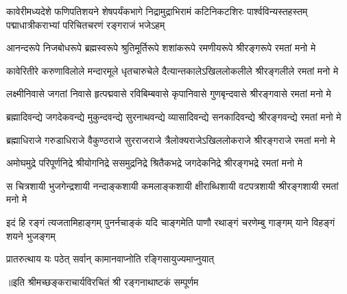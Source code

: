 
{कावेरीमध्यदेशे फणिपतिशयने शेषपर्यंकभागे}
{निद्रामुद्राभिरामं कटिनिकटशिरः पार्श्वविन्यस्तहस्तम्}
{पद्माधात्रीकराभ्यां परिचितचरणं रङ्गराजं भजेऽहम्}

\fourlineindentedshloka
{आनन्दरूपे  निजबोधरूपे}
{ब्रह्मस्वरूपे श्रुतिमूर्तिरूपे}
{शशांकरूपे रमणीयरूपे}
{श्रीरङ्गरूपे रमतां मनो मे}

\fourlineindentedshloka
{कावेरितीरे करुणाविलोले}
{मन्दारमूले धृतचारुचेले}
{दैत्यान्तकालेऽखिललोकलीले}
{श्रीरङ्गलीले रमतां मनो मे}

\fourlineindentedshloka
{लक्ष्मीनिवासे जगतां निवासे}
{हृत्पद्मवासे रविबिम्बवासे}
{कृपानिवासे गुणबृन्दवासे}
{श्रीरङ्गवासे रमतां मनो मे}


\fourlineindentedshloka
{ब्रह्मादिवन्द्ये जगदेकवन्द्ये}
{मुकुन्दवन्द्ये सुरनाथवन्द्ये}
{व्यासादिवन्द्ये सनकादिवन्द्ये}
{श्रीरङ्गवन्द्ये रमतां मनो मे}

\fourlineindentedshloka
{ब्रह्माधिराजे गरुडाधिराजे}
{वैकुण्ठराजे सुरराजराजे}
{त्रैलोक्यराजेऽखिललोकराजे}
{श्रीरङ्गराजे रमतां मनो मे}

\fourlineindentedshloka
{अमोघमुद्रे परिपूर्णनिद्रे}
{श्रीयोगनिद्रे ससमुद्रनिद्रे}
{श्रितैकभद्रे जगदेकनिद्रे}
{श्रीरङ्गभद्रे रमतां मनो मे}


\fourlineindentedshloka
{स चित्रशायी भुजगेन्द्रशायी}
{नन्दाङ्कशायी कमलाङ्कशायी}
{क्षीराब्धिशायी वटपत्रशायी}
{श्रीरङ्गशायी रमतां मनो मे}


\fourlineindentedshloka
{इदं हि रङ्गं त्यजतामिहाङ्गम्}
{पुनर्नचाङ्कं यदि चाङ्गमेति}
{पाणौ रथाङ्गं चरणेम्बु गाङ्गम्}
{याने विहङ्गं शयने भुजङ्गम्}


{प्रातरुत्थाय यः पठेत्}
{सर्वान् कामानवाप्नोति}
{रङ्गिसायुज्यमाप्नुयात्}

{॥इति श्रीमच्छङ्कराचार्यविरचितं श्री रङ्गनाथाष्टकं सम्पूर्णम}